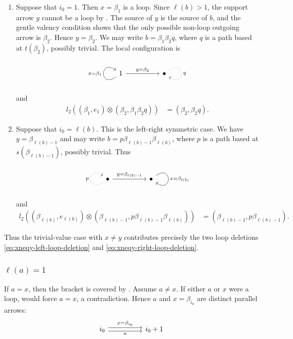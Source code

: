 \documentclass[11pt,a4paper,reqno]{amsart}
\newcommand{\para}[2]{(#1,#2)}
\newcommand{\bi}{\beta_{i_0}}
\newcommand{\bet}{\beta_{\ell(b)}}
\theoremstyle{plain}
\theoremstyle{definition}
\numberwithin{equation}{section}
\begin{document}
	\begin{enumerate}
		\item Suppose that $i_0=1$.  Then $x=\beta_1$ is a loop.  Since
		$\ell(b)>1$, the support arrow $y$ cannot be a loop by .
		The source of $y$ is the source of $b$, and the gentle valency condition
		shows that the only possible non-loop outgoing arrow is $\beta_2$.
		Hence $y=\beta_2$.  We may write
		$b=\beta_1\beta_2 q$,
		where $q$ is a path based at $t(\beta_2)$, possibly trivial.  The local
		configuration is
		\[
		\begin{tikzcd}
			1 && \bullet
			\arrow["{x=\beta_1}", from=1-1, to=1-1, loop, in=145, out=215, distance=10mm]
			\arrow["{y=\beta_2}", from=1-1, to=1-3]
			\arrow["q", dotted, from=1-3, to=1-3, loop, in=325, out=35, distance=10mm]
		\end{tikzcd}
		\]
		and
		\begin{align}
			l_2(\para{\beta_1}{e_1}\otimes \para{\beta_2}{\beta_1\beta_2 q})
			&=\para{\beta_2}{\beta_2 q}.
			\label{eq:xneqy-left-loop-deletion}
		\end{align}
		
		\item Suppose that $i_0=\ell(b)$.  This is the left-right symmetric
		case.  We have $y=\beta_{\ell(b)-1}$ and may write
		$b=p\beta_{\ell(b)-1}\bet$,
		where $p$ is a path based at $s(\beta_{\ell(b)-1})$, possibly trivial.
		Thus
		\[
		\begin{tikzcd}
			\bullet && \bullet
			\arrow["p", dotted, from=1-1, to=1-1, loop, in=145, out=215, distance=10mm]
			\arrow["{y=\beta_{\ell(b)-1}}", from=1-1, to=1-3]
			\arrow["{x=\bet}", from=1-3, to=1-3, loop, in=325, out=35, distance=10mm]
		\end{tikzcd}
		\]
		and
		\begin{align}
			l_2(\para{\bet}{e_{\ell(b)}}\otimes \para{\beta_{\ell(b)-1}}{p\beta_{\ell(b)-1}\bet})
			&=\para{\beta_{\ell(b)-1}}{p\beta_{\ell(b)-1}}.
			\label{eq:xneqy-right-loop-deletion}
		\end{align}
	\end{enumerate}
	
	Thus the trivial-value case with $x\neq y$ contributes precisely the two
	loop deletions
	\eqref{eq:xneqy-left-loop-deletion} and
	\eqref{eq:xneqy-right-loop-deletion}.
	
	\subsubsection{$\ell(a)=1$}\label{subsec:xneqy-ella-one}
	If $a=x$, then the bracket is covered by .  Assume $a\neq x$.
	If either $a$ or $x$ were a loop,  would force $a=x$, a
	contradiction.  Hence $a$ and $x=\bi$ are distinct parallel arrows:
	\[
	\begin{tikzcd}
		i_0 && i_0+1
		\arrow["a"', shift right, from=1-1, to=1-3]
		\arrow["x=\bi", shift left, from=1-1, to=1-3]
	\end{tikzcd}
	\]
	
\end{document}
